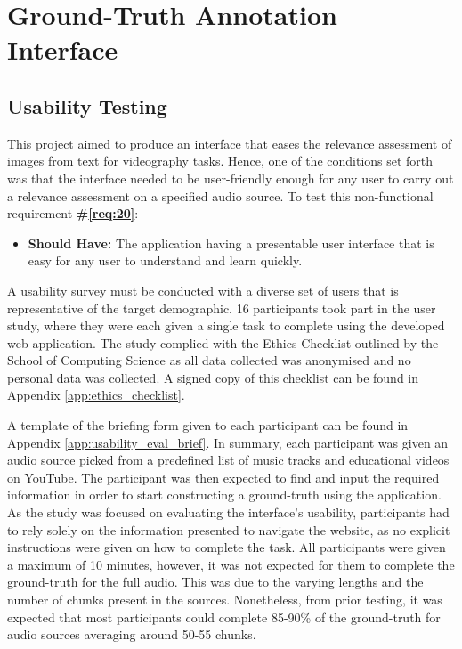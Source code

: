 \documentclass{l4proj}
\begin{document}
\section{Ground-Truth Annotation Interface}
\subsection{Usability Testing}
\label{sec:usability_testing}
This project aimed to produce an interface that eases the relevance assessment of images from text for videography tasks. Hence, one of the conditions set forth was that the interface needed to be user-friendly enough for any user to carry out a relevance assessment on a specified audio source. To test this non-functional requirement \textbf{\#\ref{req:20}}:

\begin{itemize}
    \item \textbf{Should Have:} The application having a presentable user interface that is easy for any user to understand and learn quickly.
\end{itemize}

A usability survey must be conducted with a diverse set of users that is representative of the target demographic. 16 participants took part in the user study, where they were each given a single task to complete using the developed web application. The study complied with the Ethics Checklist outlined by the School of Computing Science as all data collected was anonymised and no personal data was collected. A signed copy of this checklist can be found in Appendix \ref{app:ethics_checklist}.

A template of the briefing form given to each participant can be found in Appendix \ref{app:usability_eval_brief}. In summary, each participant was given an audio source picked from a predefined list of music tracks and educational videos on YouTube. The participant was then expected to find and input the required information in order to start constructing a ground-truth using the application. As the study was focused on evaluating the interface's usability, participants had to rely solely on the information presented to navigate the website, as no explicit instructions were given on how to complete the task. All participants were given a maximum of 10 minutes, however, it was not expected for them to complete the ground-truth for the full audio. This was due to the varying lengths and the number of chunks present in the sources. Nonetheless, from prior testing, it was expected that most participants could complete 85-90\% of the ground-truth for audio sources averaging around 50-55 chunks.
\end{document}
